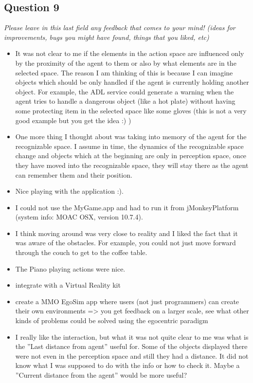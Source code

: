 \subsection{Question 9}
\emph{Please leave in this last field any feedback that comes to your mind! (ideas for improvements, bugs you might have found, things that you liked, etc)}

\begin{itemize}
	\item It was not clear to me if the elements in the action space are influenced only by the proximity of the agent to them or also by what elements are in the selected space. The reason I am thinking of this is because I can imagine objects which should be only handled if the agent is currently holding another object. For example, the ADL service could generate a warning when the agent tries to handle a dangerous object (like a hot plate) without having some protecting item in the selected space like some gloves (this is not a very good example but you get the idea :) )
	\item One more thing I thought about was taking into memory of the agent for the recognizable space. I assume in time, the dynamics of the recognizable space change and objects which at the beginning are only in perception space, once they have moved into the recognizable space, they will stay there as the agent can remember them and their position.
	\item Nice playing with the application :).
	\item I could not use the MyGame.app and had to run it from jMonkeyPlatform (system info: MOAC OSX, version 10.7.4).
	\item I think moving around was very close to reality and I liked the fact that it was aware of the obstacles. For example, you could not just move forward through the couch to get to the coffee table.
	\item The Piano playing actions were nice.
	\item integrate with a Virtual Reality kit
	\item create a MMO EgoSim app where users (not just programmers) can create their own environments => you get feedback on a larger scale, see what other kinds of problems could be solved using the egocentric paradigm
	\item I really like the interaction, but what it was not quite clear to me was what is the ''Last distance from agent'' useful for. Some of the objects displayed there were not even in the perception space and still they had a distance. It did not know what I was supposed to do with the info or how to check it. Maybe a ''Current distance from the agent'' would be more useful?

\end{itemize}
